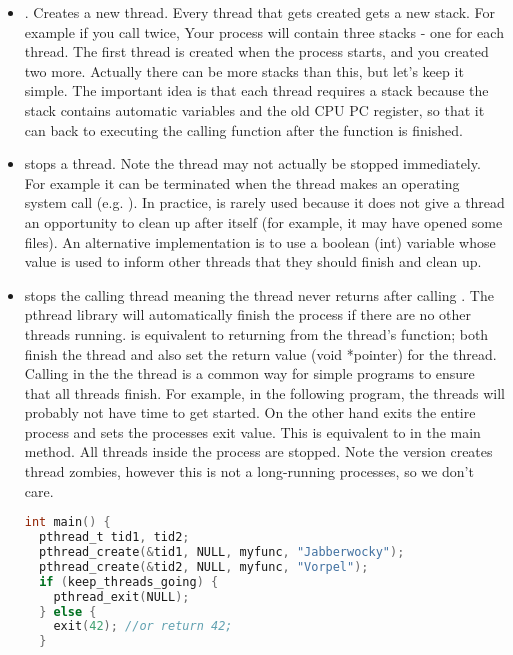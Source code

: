 \begin{itemize}
\item {}.
Creates a new thread.
Every thread that gets created gets a new stack.
For example if you call  twice, Your process will contain three stacks - one for each thread.
The first thread is created when the process starts, and you created two more.
Actually there can be more stacks than this, but let's keep it simple.
The important idea is that each thread requires a stack because the stack contains automatic variables and the old CPU PC register, so that it can back to executing the calling function after the function is finished.

\item {} stops a thread.
Note the thread may not actually be stopped immediately.
For example it can be terminated when the thread makes an operating system call (e.g. ).
In practice,  is rarely used because it does not give a thread an opportunity to clean up after itself (for example, it may have opened some files).
An alternative implementation is to use a boolean (int) variable whose value is used to inform other threads that they should finish and clean up.

\item {} stops the calling thread meaning the thread never returns after calling .
The pthread library will automatically finish the process if there are no other threads running.
 is equivalent to returning from the thread's function; both finish the thread and also set the return value (void *pointer) for the thread.
Calling  in the the  thread is a common way for simple programs to ensure that all threads finish.
For example, in the following program, the  threads will probably not have time to get started.
On the other hand  exits the entire process and sets the processes exit value.
This is equivalent to  in the main method.
All threads inside the process are stopped.
Note the  version creates thread zombies, however this is not a long-running processes, so we don't care.

\begin{lstlisting}[language=C]
int main() {
  pthread_t tid1, tid2;
  pthread_create(&tid1, NULL, myfunc, "Jabberwocky");
  pthread_create(&tid2, NULL, myfunc, "Vorpel");
  if (keep_threads_going) {
    pthread_exit(NULL);
  } else {
    exit(42); //or return 42;
  }


\end{lstlisting}
\end{itemize}
